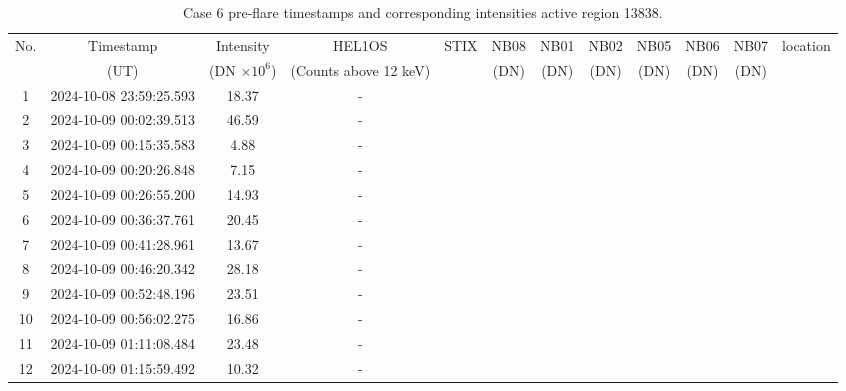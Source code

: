 \documentclass[fleqn,usenatbib]{mnras}
\begin{document}
\begin{table}
    \centering
    \caption{Case 6 pre-flare timestamps and corresponding intensities active region 13838.}
   \begin{tabular}{cccccccccccc}
        \hline
        No. & Timestamp & Intensity & HEL1OS & STIX & NB08 &NB01 & NB02 & NB05 & NB06 & NB07 & location\\
        &(UT) & (DN $\times 10^6$) & (Counts above 12 keV) & & (DN)& (DN)& (DN)& (DN)& (DN) & (DN)\\
        \hline
  	1 & 2024-10-08 23:59:25.593 & 18.37 & - \\
	2 & 2024-10-09 00:02:39.513 & 46.59 & - \\
	3 & 2024-10-09 00:15:35.583 & 4.88 & - \\
	4 & 2024-10-09 00:20:26.848 & 7.15 & - \\
	5 & 2024-10-09 00:26:55.200 & 14.93 & - \\
	6 & 2024-10-09 00:36:37.761 & 20.45 & - \\
	7 & 2024-10-09 00:41:28.961 & 13.67 & - \\
	8 & 2024-10-09 00:46:20.342 & 28.18 & - \\
	9 & 2024-10-09 00:52:48.196 & 23.51 & - \\
	10 & 2024-10-09 00:56:02.275 & 16.86 & - \\
	11 & 2024-10-09 01:11:08.484 & 23.48 & - \\
	12 & 2024-10-09 01:15:59.492 & 10.32 & - \\

        \hline
    \end{tabular}
\end{table}
\end{document}
